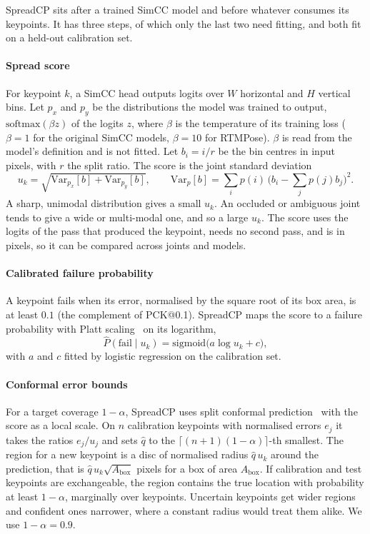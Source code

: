 \documentclass[preprint,11pt]{elsarticle}
\newcommand{\method}{SpreadCP}
\begin{document}
\method{} sits after a trained SimCC model and before whatever consumes its keypoints. It has three
steps, of which only the last two need fitting, and both fit on a held-out calibration set.

\paragraph{Spread score} For keypoint $k$, a SimCC head outputs logits over $W$ horizontal and $H$
vertical bins. Let $p_x$ and $p_y$ be the distributions the model was trained to output,
$\mathrm{softmax}(\beta z)$ of the logits $z$, where $\beta$ is the temperature of its training loss
($\beta=1$ for the original SimCC models, $\beta=10$ for RTMPose). $\beta$ is read from the model's
definition and is not fitted. Let $b_i = i/r$ be the bin centres in input pixels, with $r$ the split
ratio. The score is the joint standard deviation
\begin{equation}
u_k = \sqrt{\mathrm{Var}_{p_x}[b] + \mathrm{Var}_{p_y}[b]}, \qquad
\mathrm{Var}_{p}[b] = \sum_i p(i)\,\big(b_i - \textstyle\sum_j p(j) b_j\big)^2 .
\end{equation}
A sharp, unimodal distribution gives a small $u_k$. An occluded or ambiguous joint tends to give a
wide or multi-modal one, and so a large $u_k$. The score uses the logits of the pass that produced the
keypoint, needs no second pass, and is in pixels, so it can be compared across joints and models.

\paragraph{Calibrated failure probability} A keypoint fails when its error, normalised by the square
root of its box area, is at least $0.1$ (the complement of PCK@0.1). \method{} maps the score to a
failure probability with Platt scaling~\cite{platt1999probabilistic} on its logarithm,
\begin{equation}
\hat P(\text{fail}\mid u_k) = \mathrm{sigmoid}\big(a \log u_k + c\big),
\end{equation}
with $a$ and $c$ fitted by logistic regression on the calibration set.

\paragraph{Conformal error bounds} For a target coverage $1-\alpha$, \method{} uses split conformal
prediction~\cite{angelopoulos2021gentle} with the score as a local scale. On $n$ calibration keypoints
with normalised errors $e_j$ it takes the ratios $e_j / u_j$ and sets $\hat q$ to the $\lceil
(n+1)(1-\alpha) \rceil$-th smallest. The region for a new keypoint is a disc of normalised radius
$\hat q\, u_k$ around the prediction, that is $\hat q\, u_k \sqrt{A_{\text{box}}}$ pixels for a box of
area $A_{\text{box}}$. If calibration and test keypoints are exchangeable, the region contains the
true location with probability at least $1-\alpha$, marginally over keypoints. Uncertain keypoints get
wider regions and confident ones narrower, where a constant radius would treat them alike. We use
$1-\alpha = 0.9$.
\end{document}
